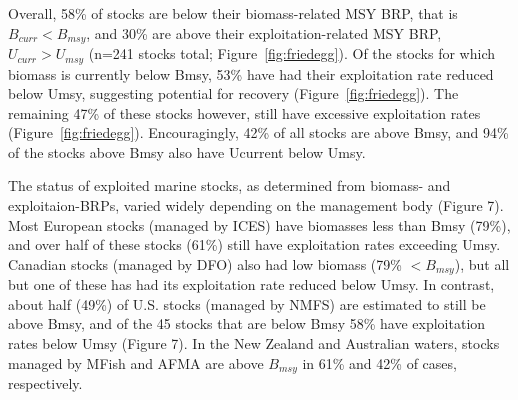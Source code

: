 Overall, 58\% of stocks are below
their biomass-related MSY BRP, that is $B_{curr}<B_{msy}$, and
30\% are above their
exploitation-related MSY BRP, $U_{curr}>U_{msy}$
(n=241 stocks total; Figure~\ref{fig:friedegg}).
Of the stocks for which biomass is currently below Bmsy,
53\% have had their
exploitation rate reduced below Umsy, suggesting potential for
recovery (Figure~\ref{fig:friedegg}). The remaining
47\% of these stocks however,
still have excessive exploitation rates (Figure~\ref{fig:friedegg}).
Encouragingly, 42\% of all stocks are
above Bmsy, and 94\% of the
stocks above Bmsy also have Ucurrent below Umsy. 


The status of exploited marine stocks, as determined from biomass- and
exploitaion-BRPs, varied widely depending on the management body
(Figure 7). Most European stocks (managed by ICES) have biomasses less
than Bmsy (79\%), and over half
of these stocks (61\%)
still have exploitation rates exceeding Umsy. Canadian stocks (managed
by DFO) also had low biomass (79\%
$< B_{msy}$), but all but one of these has had its exploitation rate
reduced below Umsy. In contrast, about half
(49\%) of U.S. stocks (managed by
NMFS) are estimated to still be above Bmsy, and of the
45 stocks that are below Bmsy
58\% have exploitation
rates below Umsy (Figure 7). In the New Zealand and Australian waters,
stocks managed by MFish and AFMA are above $B_{msy}$ in
61\% and
42\% of cases, respectively.





 

